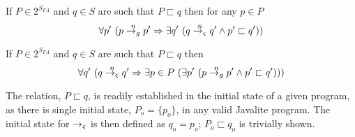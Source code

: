 \begin{corollary}
If $P \in 2^{S_\mathit{FA}}$ and $q \in S$ are such that $P \sqsubset q$ then for any $p \in P$
$$
\forall p^\prime\ (p \stackrel{n}{\rightarrow_{g}} p^\prime \Rightarrow \exists q^\prime\ (q \stackrel{n}{\rightarrow_{\varsigma}} q^\prime \wedge p^\prime \sqsubset q^\prime))
$$
\end{corollary}

\begin{corollary}
If $P \in 2^{S_\mathit{FA}}$ and $q \in S$ are such that $P \sqsubset q$ then
$$
\forall q^\prime\ (q \stackrel{n}{\rightarrow_{\varsigma}} q^\prime \Rightarrow \exists p \in P\ (\exists p^\prime\ (p \stackrel{n}{\rightarrow_{g}} p^\prime \wedge p^\prime \sqsubset q^\prime)))
$$
\end{corollary}

The relation, $P \sqsubset q$, is readily established in the initial
state of a given program, as there is single initial state, $P_o =
\{p_o\}$, in any valid Javalite program. The initial state for $\rightarrow_{\varsigma}$ is
then defined as $q_o = p_o$; $P_o \sqsubset q_o$ is trivially shown.
